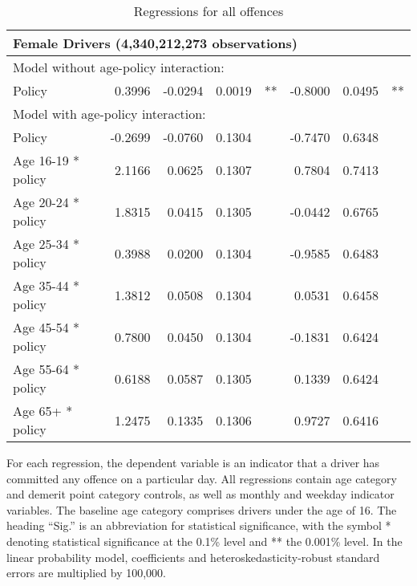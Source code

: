 \begin{table}
\begin{tabular}{l r r r l r r l}
\hline 

\multicolumn{7}{l}{\textbf{Female Drivers} (4,340,212,273 observations)} \\ 

\hline
\multicolumn{7}{l}{Model without age-policy interaction: } \\ 
Policy                   &  0.3996       &  -0.0294        &  0.0019       &   **       &  -0.8000        &  0.0495       &   **       \\ 
\hline
\multicolumn{7}{l}{Model with age-policy interaction: } \\ 
Policy                   &  -0.2699       &  -0.0760        &  0.1304       &            &  -0.7470        &  0.6348       &            \\ 
Age 16-19 * policy   &  2.1166       &  0.0625        &  0.1307       &            &  0.7804        &  0.7413       &            \\ 
Age 20-24 * policy   &  1.8315       &  0.0415        &  0.1305       &            &  -0.0442        &  0.6765       &            \\ 
Age 25-34 * policy   &  0.3988       &  0.0200        &  0.1304       &            &  -0.9585        &  0.6483       &            \\ 
Age 35-44 * policy   &  1.3812       &  0.0508        &  0.1304       &            &  0.0531        &  0.6458       &            \\ 
Age 45-54 * policy   &  0.7800       &  0.0450        &  0.1304       &            &  -0.1831        &  0.6424       &            \\ 
Age 55-64 * policy   &  0.6188       &  0.0587        &  0.1305       &            &  0.1339        &  0.6424       &            \\ 
Age 65+ * policy   &  1.2475       &  0.1335        &  0.1306       &            &  0.9727        &  0.6416       &            \\ 

\hline 

\end{tabular} 
\caption{Regressions for all offences} 
For each regression, the dependent variable is an indicator that a driver has committed  
any offence on a particular day.  
All regressions contain age category and demerit point category controls, 
as well as monthly and weekday indicator variables. 
The baseline age category comprises drivers under the age of 16. 
The heading ``Sig.'' is an abbreviation for statistical significance, with 
the symbol * denoting statistical significance at the 0.1\% level 
and ** the 0.001\% level. 
In the linear probability model, coefficients and heteroskedasticity-robust standard errors are  
multiplied by 100,000.  
\label{tab:seas_Logit_vs_LPMx100K_regs} 
\end{table} 
 
